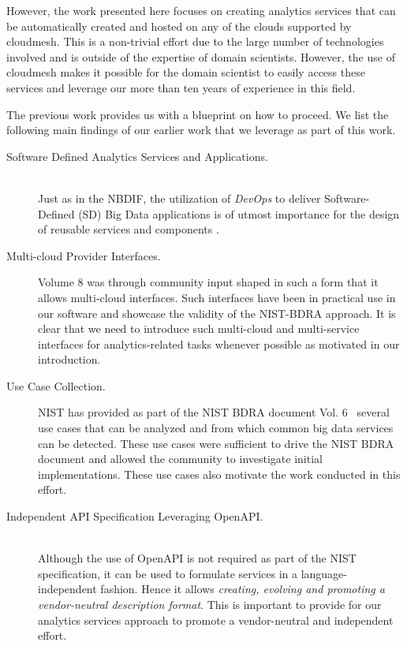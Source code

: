 However, the work presented here focuses on creating analytics services that can be automatically created and hosted on any of the clouds supported by cloudmesh. This is a non-trivial effort due to the large number of technologies involved and is outside of the expertise of domain scientists. However, the use of cloudmesh makes it possible for the domain scientist to easily access these services and leverage our more than ten years of experience in this field.

The previous work provides us with a blueprint on how to proceed.  We list the following main findings of our earlier work that we leverage as part of this work.

\begin{description}
  
\item[Software Defined Analytics Services and Applications.] ~\\ 
  Just as
  in the NBDIF, the utilization of \emph{DevOps} to deliver
  Software-Defined (SD) Big Data applications is of
 utmost importance for the design of reusable services and components \cite{cloudmesh-manual,bigdata-stack-1,bigdata-stack-2}. 
  
\item[Multi-cloud Provider Interfaces.] Volume 8 was through community
  input shaped in such a form that it allows multi-cloud
  interfaces. Such interfaces have been in practical use in our software and showcase the validity of the NIST-BDRA approach. It is clear that we need to introduce such multi-cloud and multi-service
  interfaces for analytics-related tasks whenever possible as motivated in our introduction. 

\item[Use Case Collection.] NIST has provided as part of the NIST BDRA
  document Vol. 6~\cite{nist-v6} several use cases that can be analyzed and from which common big data services can be detected. These use
  cases were sufficient to drive the NIST BDRA document \cite{nist-v6}
  and allowed the community to investigate initial implementations. These use cases also motivate the work conducted in this effort.

\item[Independent API Specification Leveraging OpenAPI.] ~\\ Although the use of OpenAPI \cite{openapi,openapi-tools} is not required as part of the NIST specification, it can be used to formulate services in a
  language-independent fashion. Hence it allows {\em creating, evolving and promoting a vendor-neutral description format}. This is important to provide for our analytics services approach to promote a vendor-neutral and independent effort.


\end{description}
